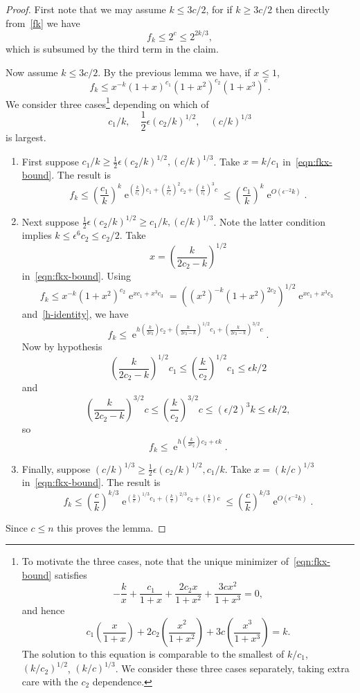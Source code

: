 \documentclass[ALCO,ThmDefs,Unicode,epreuves]{cedram}
\DeclareMathOperator{\expe}{e}
\newcommand{\eps}{\epsilon}
\newcommand\br[1]{\left({#1}\right)}
\newcommand\pfrac[2]{\br{\frac{#1}{#2}}}
\begin{document}
\begin{proof}
First note that we may assume $k \leq 3c/2$, for if $k \geq 3c/2$ then directly from~\eqref{fk} we have
\[
 f_k \leq 2^c \leq 2^{2k/3},
\]
which is subsumed by the third term in the claim.

Now assume $k \leq 3c/2$. By the previous lemma we have, if $x \leq 1$,
\begin{equation} \label{eqn:fkx-bound}
 f_k \leq x^{-k} (1+x)^{c_1} (1+x^2)^{c_2} (1+x^3)^{c}.
\end{equation}
We consider three cases\footnote{To motivate the three cases, note that the unique minimizer of~\eqref{eqn:fkx-bound} satisfies
\[
-\frac{k}{x} + \frac{c_1}{1+x} + \frac{2c_2 x}{1+x^2} + \frac{3c x^2}{1+x^3} = 0,
\]
and hence
\[
 c_1 \pfrac{x}{1+x} + 2c_2 \pfrac{x^2}{1+x^2} + 3c \pfrac{x^3}{1+x^3} = k.
\]
The solution to this equation is comparable to the smallest of $k/c_1$, $(k/c_2)^{1/2}$, $(k/c)^{1/3}$.
We consider these three cases separately, taking extra care with the $c_2$ dependence.}
depending on which of
\[
 c_1/k,\quad \frac12 \eps (c_2 / k)^{1/2},\quad (c / k)^{1/3}
\]
is largest.
\begin{enumerate}
 \item\label{proof_lemm3.2_1} First suppose $c_1 / k \geq \frac12 \eps (c_2 / k)^{1/2}, (c / k)^{1/3}$. Take $x = k / c_1$ in~\eqref{eqn:fkx-bound}. The result is
 \[
 f_k \leq \pfrac{c_1}{k}^k \expe^{\pfrac{k}{c_1} c_1 + \pfrac{k}{c_1}^2 c_2 + \pfrac{k}{c_1}^3 c} \leq \pfrac{c_1}{k}^k \expe^{O(\eps^{-2} k)}.
 \]
 \item\label{proof_lemm3.2_2} Next suppose $\frac12 \eps(c_2 / k)^{1/2} \geq c_1/k, (c/k)^{1/3}$. Note the latter condition implies $k \leq \eps^6 c_2 \leq c_2 / 2$. Take
 \[
 x = \pfrac{k}{2c_2 - k}^{1/2}
 \]
 in~\eqref{eqn:fkx-bound}. Using
 \[
 f_k \leq x^{-k} (1+x^2)^{c_2} \expe^{x c_1 + x^3 c_3}
 = \br{(x^2)^{-k} (1+x^2)^{2c_2}}^{1/2} \expe^{x c_1 + x^3 c_3}
 \]
 and~\eqref{h-identity}, we have
 \[
 f_k
 \leq \expe^{h \pfrac{k}{2c_2} c_2 + \pfrac{k}{2c_2-k}^{1/2} c_1 + \pfrac{k}{2c_2-k}^{3/2} c}.
 \]
 Now by hypothesis
 \[
 \pfrac{k}{2c_2 - k}^{1/2} c_1 \leq \pfrac{k}{c_2}^{1/2} c_1 \leq \eps k / 2
 \]
 and
 \[
 \pfrac{k}{2c_2-k}^{3/2} c \leq \pfrac{k}{c_2}^{3/2} c \leq (\eps / 2)^3 k \leq \eps k / 2,
 \]
 so
 \[
 f_k \leq \expe^{h \pfrac{k}{2c_2} c_2 + \eps k}.
 \]
 \item\label{proof_lemm3.2_3} Finally, suppose $(c / k)^{1/3} \geq \frac12 \eps (c_2 / k)^{1/2}, c_1 / k$. Take $x = (k/c)^{1/3}$ in~\eqref{eqn:fkx-bound}. The result is
 \[
 f_k \leq \pfrac{c}{k}^{k/3} \expe^{\pfrac{k}{c}^{1/3} c_1 + \pfrac{k}{c}^{2/3} c_2 + \pfrac{k}{c} c} \leq \pfrac{c}{k}^{k/3} \expe^{O(\eps^{-2} k)}.
 \]
\end{enumerate}
Since $c \leq n$ this proves the lemma.
\end{proof}
\end{document}
